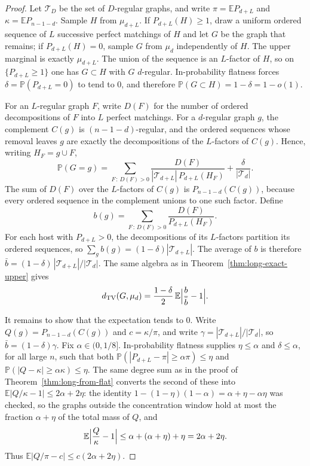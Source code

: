 \documentclass[11pt]{article}
\newcommand{\EE}{\mathbb{E}}
\newcommand{\PP}{\mathbb{P}}
\newcommand{\dTV}{d_{\mathrm{TV}}}
\begin{document}
\begin{proof}
Let \(\mathcal T_D\) be the set of \(D\)-regular graphs, and write
\(\pi=\EE P_{d+L}\) and \(\kappa=\EE P_{n-1-d}\).
Sample \(H\) from \(\mu_{d+L}\).
If \(P_{d+L}(H)\ge 1\), draw a uniform ordered sequence of \(L\) successive
perfect matchings of \(H\) and let \(G\) be the graph that remains; if
\(P_{d+L}(H)=0\), sample \(G\) from \(\mu_d\) independently of \(H\).
The upper marginal is exactly \(\mu_{d+L}\).
The union of the sequence is an \(L\)-factor of \(H\), so on
\(\{P_{d+L}\ge 1\}\) one has \(G\subset H\) with \(G\) \(d\)-regular.
In-probability flatness forces \(\delta=\PP(P_{d+L}=0)\) to tend to \(0\), and
therefore \(\PP(G\subset H)=1-\delta=1-o(1)\).

For an \(L\)-regular graph \(F\), write \(D(F)\) for the number of ordered
decompositions of \(F\) into \(L\) perfect matchings.
For a \(d\)-regular graph \(g\), the complement \(C(g)\) is
\((n-1-d)\)-regular, and the ordered sequences whose removal leaves \(g\) are
exactly the decompositions of the \(L\)-factors of \(C(g)\).
Hence, writing \(H_F=g\cup F\),
\[
\PP(G=g)
=
\sum_{F\,:\,D(F)>0}
\frac{D(F)}{|\mathcal T_{d+L}|\,P_{d+L}(H_F)}
+
\frac{\delta}{|\mathcal T_d|}.
\]
The sum of \(D(F)\) over the \(L\)-factors of \(C(g)\) is \(P_{n-1-d}(C(g))\),
because every ordered sequence in the complement unions to one such factor.
Define
\[
b(g)
=
\sum_{F\,:\,D(F)>0}
\frac{D(F)}{P_{d+L}(H_F)}.
\]
For each host with \(P_{d+L}>0\), the decompositions of its \(L\)-factors
partition its ordered sequences, so \(\sum_g b(g)=(1-\delta)|\mathcal T_{d+L}|\).
The average of \(b\) is therefore
\(\bar b=(1-\delta)\,|\mathcal T_{d+L}|/|\mathcal T_d|\).
The same algebra as in Theorem~\ref{thm:long-exact-upper} gives
\[
\dTV(G,\mu_d)
=
\frac{1-\delta}{2}\,
\EE\Bigl|\frac{b}{\bar b}-1\Bigr|.
\]

It remains to show that the expectation tends to \(0\).
Write \(Q(g)=P_{n-1-d}(C(g))\) and \(c=\kappa/\pi\), and write
\(\gamma=|\mathcal T_{d+L}|/|\mathcal T_d|\), so \(\bar b=(1-\delta)\gamma\).
Fix \(\alpha\in(0,1/8]\).
In-probability flatness supplies \(\eta\le\alpha\) and \(\delta\le\alpha\), for
all large \(n\), such that both
\(\PP(|P_{d+L}-\pi|\ge\alpha\pi)\le\eta\) and
\(\PP(|Q-\kappa|\ge\alpha\kappa)\le\eta\).
The same degree sum as in the proof of Theorem~\ref{thm:long-from-flat}
converts the second of these into \(\EE|Q/\kappa-1|\le 2\alpha+2\eta\): the
identity \(1-(1-\eta)(1-\alpha)=\alpha+\eta-\alpha\eta\) was checked, so the
graphs outside the concentration window hold at most the fraction
\(\alpha+\eta\) of the total mass of \(Q\), and
\[
\EE\Bigl|\frac{Q}{\kappa}-1\Bigr|
\le
\alpha+(\alpha+\eta)+\eta
=
2\alpha+2\eta.
\]
Thus \(\EE|Q/\pi-c|\le c(2\alpha+2\eta)\).


\end{proof}
\end{document}
